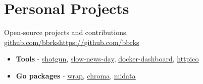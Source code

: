 \documentclass[11pt,a4paper]{moderncv}
\newcommand\styledhref[2]{\uline{\href{#1}{#2}}}
\newcommand\styledurl[1]{\uline{\url{#1}}}
\begin{document}

	\section{Personal Projects}
		\cventry
			{}{Open-source projects and contributions.}
			{\href{https://github.com/bbrks}{github.com/bbrks}}{\styledurl{https://github.com/bbrks}}
			{}{\begin{itemize}
				\item \textbf{Tools} -
					\styledhref{https://github.com/bbrks/shotgun}{shotgun},
					\styledhref{https://github.com/bbrks/slow-news-day}{slow-news-day},
					\styledhref{https://github.com/bbrks/docker-dashboard}{docker-dashboard},
					\styledhref{https://github.com/bbrks/httpico}{httpico}
				\item \textbf{Go packages} -
					\styledhref{https://github.com/bbrks/wrap}{wrap},
					\styledhref{https://github.com/bbrks/chroma}{chroma},
					\styledhref{https://github.com/bbrks/midata}{midata}
			\end{itemize}}
			
\end{document}
